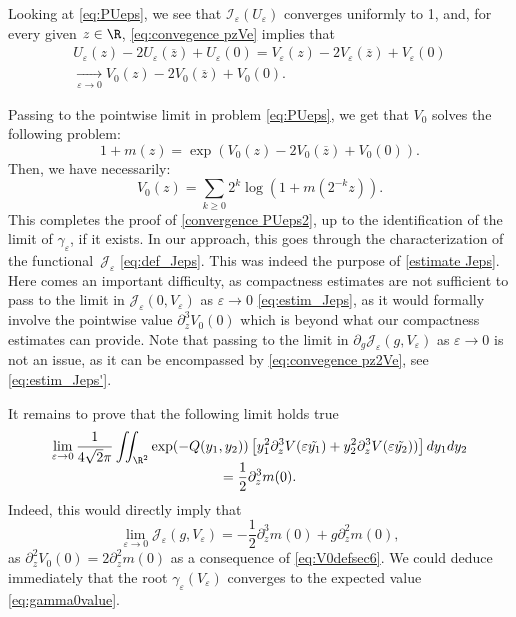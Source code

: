 \documentclass[10pt]{amsart}
\let\mathcal\mathscr
\newcommand{\cI}{\mathcal{I}}
\theoremstyle{plain}
\theoremstyle{definition}
\newcommand{\Je}{\mathcal{J}_\eps}
\let\eps\varepsilon
\let\ds\displaystyle
\newcommand{\bz}{\overline{z}}
\begin{document}
Looking at \eqref{eq:PUeps}, we see that $\cI_\eps(U_\eps)$ converges uniformly to 1, and, for every given $z\in \R$, \eqref{eq:convegence pzVe} implies that
\begin{multline}\label{eq:vareq_V}
U_\eps(z)-2U_\eps(\bz) + U_\eps(0) = V_\eps(z)-2V_\eps(\bz) + V_\eps(0)\\ \xrightarrow[\eps \to 0]{} V_0(z)-2V_0(\bz) + V_0(0).
\end{multline}

Passing to the pointwise limit in problem \eqref{eq:PUeps}, we get that $V_0$ solves the following problem:
\begin{equation*}
1 + m(z) = \exp \left(V_0(z)-2 V_0(\bz) + V_0(0) \right).
\end{equation*}
Then, we have necessarily:
\begin{equation}\label{eq:V0defsec6}
V_0(z) = \ds \sum_{k\geq 0} 2^k \log \left(1 + m(2^{-k}z) \right).
\end{equation}
This completes the proof of \eqref{convergence PUeps2}, up to the identification of the limit of $\gamma_\eps$, if it exists. In our approach, this goes through the characterization of the functional~$\Je$ \eqref{eq:def_Jeps}. This was indeed the purpose of \cref{estimate Jeps}. Here comes an important difficulty, as compactness estimates are not sufficient to pass to the limit in $\Je(0,V_\eps)$ as $\eps\to0$ \eqref{eq:estim_Jeps}, as it would formally involve the pointwise value $\partial_z^3V_0(0)$ which is beyond what our compactness estimates can provide. Note that passing to the limit in $\partial_g\Je(g,V_\eps)$ as $\eps\to0$ is not an issue, as it can be encompassed by \eqref{eq:convegence pz2Ve}, see \eqref{eq:estim_Jeps'}.

It remains to prove that the following limit holds true
\begin{multline}\label{eq:limV3}
\lim_{\eps \to 0}\dfrac{1}{4\sqrt{2}\pi} \iint _{\R^2} \exp(-Q (y_1,y_2)) \left[ y_1^2 \partial_z^3 V(\eps \tilde{y_1}) + y_2^2 \partial_z^3 V(\eps \tilde{y_2})) \right] dy_1dy_2\\[-5pt]
= \dfrac12 \partial_z^3m(0).
\end{multline}
Indeed, this would directly imply that
\begin{equation*}
\lim_{\eps\to 0} \Je(g,V_\eps) = - \dfrac{1}2\partial_z^3m(0) + g \partial_z^2m(0) ,
\end{equation*}
as $\partial_z^2 V_0(0) = 2\partial_z^2 m(0)$ as a consequence of \eqref{eq:V0defsec6}. We could deduce immediately that the root $\gamma_\eps(V_\eps)$ converges to the expected value \eqref{eq:gamma0value}.
\end{document}
